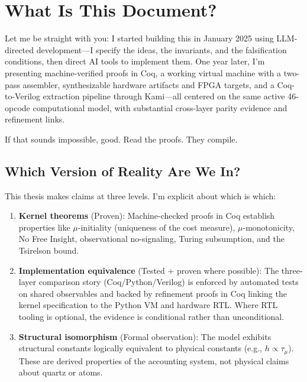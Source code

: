 \section{What Is This Document?}

Let me be straight with you: I started building this in January 2025 using LLM-directed development---I specify the ideas, the invariants, and the falsification conditions, then direct AI tools to implement them. One year later, I'm presenting machine-verified proofs in Coq, a working virtual machine with a two-pass assembler, synthesizable hardware artifacts and FPGA targets, and a Coq-to-Verilog extraction pipeline through Kami---all centered on the same active 46-opcode computational model, with substantial cross-layer parity evidence and refinement links.

If that sounds impossible, good. Read the proofs. They compile.

\subsection{Which Version of Reality Are We In?}

This thesis makes claims at three levels. I'm explicit about which is which:

\begin{tcolorbox}[thesisbox,colback=blue!5!white,colframe=blue!75!black,title=Three Levels of Claims]
\begin{enumerate}
    \item \textbf{Kernel theorems} (Proven): Machine-checked proofs in Coq establish properties like $\mu$-initiality (uniqueness of the cost measure), $\mu$-monotonicity, No Free Insight, observational no-signaling, Turing subsumption, and the Tsirelson bound.
    \item \textbf{Implementation equivalence} (Tested + proven where possible): The three-layer comparison story (Coq/Python/Verilog) is enforced by automated tests on shared observables and backed by refinement proofs in Coq linking the kernel specification to the Python VM and hardware RTL. Where RTL tooling is optional, the evidence is conditional rather than unconditional.
    \item \textbf{Structural isomorphism} (Formal observation): The model exhibits structural constants logically equivalent to physical constants (e.g., $h \propto \tau_\mu$). These are derived properties of the accounting system, not physical claims about quartz or atoms.
\end{enumerate}
\end{tcolorbox}

